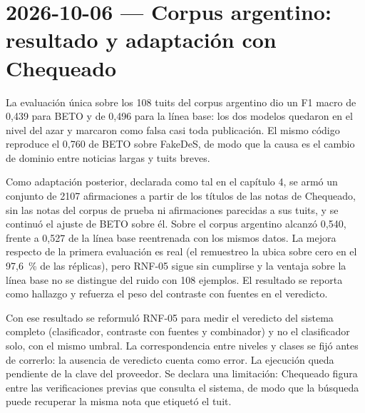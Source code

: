 \section{2026-10-06 — Corpus argentino: resultado y adaptación con Chequeado}

La evaluación única sobre los 108 tuits del corpus argentino dio un F1 macro de 0,439 para BETO y de 0,496 para la línea base: los dos modelos quedaron en el nivel del azar y marcaron como falsa casi toda publicación. El mismo código reproduce el 0,760 de BETO sobre FakeDeS, de modo que la causa es el cambio de dominio entre noticias largas y tuits breves.

Como adaptación posterior, declarada como tal en el capítulo 4, se armó un conjunto de 2107 afirmaciones a partir de los títulos de las notas de Chequeado, sin las notas del corpus de prueba ni afirmaciones parecidas a sus tuits, y se continuó el ajuste de BETO sobre él. Sobre el corpus argentino alcanzó 0,540, frente a 0,527 de la línea base reentrenada con los mismos datos. La mejora respecto de la primera evaluación es real (el remuestreo la ubica sobre cero en el 97,6~\% de las réplicas), pero RNF-05 sigue sin cumplirse y la ventaja sobre la línea base no se distingue del ruido con 108 ejemplos. El resultado se reporta como hallazgo y refuerza el peso del contraste con fuentes en el veredicto.

Con ese resultado se reformuló RNF-05 para medir el veredicto del sistema completo (clasificador, contraste con fuentes y combinador) y no el clasificador solo, con el mismo umbral. La correspondencia entre niveles y clases se fijó antes de correrlo: la ausencia de veredicto cuenta como error. La ejecución queda pendiente de la clave del proveedor. Se declara una limitación: Chequeado figura entre las verificaciones previas que consulta el sistema, de modo que la búsqueda puede recuperar la misma nota que etiquetó el tuit.

\bigskip
